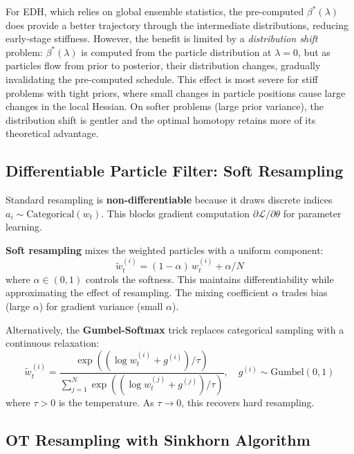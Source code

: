 \documentclass[12pt,a4paper]{article}
\theoremstyle{definition}
\theoremstyle{remark}
\begin{document}
For EDH, which relies on global ensemble statistics, the pre-computed $\beta^*(\lambda)$ does provide a better trajectory through the intermediate distributions, reducing early-stage stiffness. However, the benefit is limited by a \emph{distribution shift} problem: $\beta^*(\lambda)$ is computed from the particle distribution at $\lambda = 0$, but as particles flow from prior to posterior, their distribution changes, gradually invalidating the pre-computed schedule. This effect is most severe for stiff problems with tight priors, where small changes in particle positions cause large changes in the local Hessian. On softer problems (large prior variance), the distribution shift is gentler and the optimal homotopy retains more of its theoretical advantage.


\subsection{Differentiable Particle Filter: Soft Resampling}
\label{sec:dpf-soft}

Standard resampling is \textbf{non-differentiable} because it draws discrete indices $a_i \sim \text{Categorical}(w_t)$. This blocks gradient computation $\partial \mathcal{L} / \partial \theta$ for parameter learning.

\textbf{Soft resampling} \citep{chen2023} mixes the weighted particles with a uniform component:
\begin{equation}
	\tilde{w}_t^{(i)} = (1 - \alpha) \, w_t^{(i)} + \alpha / N
\end{equation}
where $\alpha \in (0, 1)$ controls the softness. This maintains differentiability while approximating the effect of resampling. The mixing coefficient $\alpha$ trades bias (large $\alpha$) for gradient variance (small $\alpha$).

Alternatively, the \textbf{Gumbel-Softmax} trick replaces categorical sampling with a continuous relaxation:
\begin{equation}
	\tilde{w}_t^{(i)} = \frac{\exp((\log w_t^{(i)} + g^{(i)}) / \tau)}{\sum_{j=1}^{N} \exp((\log w_t^{(j)} + g^{(j)}) / \tau)}, \quad g^{(i)} \sim \text{Gumbel}(0,1)
\end{equation}
where $\tau > 0$ is the temperature. As $\tau \to 0$, this recovers hard resampling.


\subsection{OT Resampling with Sinkhorn Algorithm}
\label{sec:dpf-ot}
\end{document}
